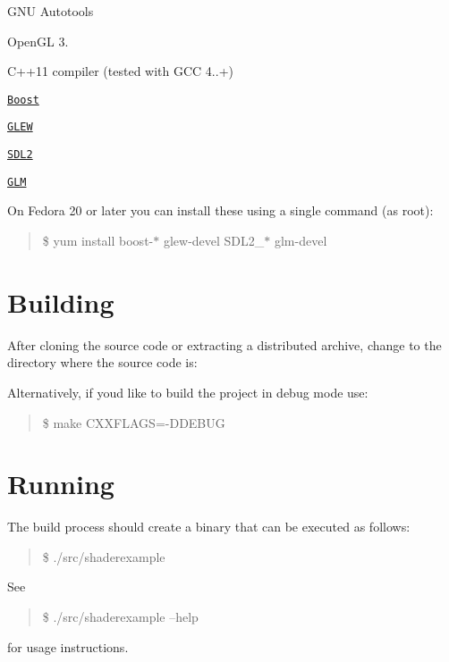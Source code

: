 
\begin{DoxyItemize}
\item G\+N\+U Autotools
\item Open\+G\+L 3.
\item C++11 compiler (tested with G\+C\+C 4..+)
\item \href{http://www.boost.org/}{\tt Boost}
\item \href{http://glew.sourceforge.net/}{\tt G\+L\+E\+W}
\item \href{https://www.libsdl.org/}{\tt S\+D\+L2}
\item \href{http://glm.g-truc.net/}{\tt G\+L\+M}
\end{DoxyItemize}

On Fedora 20 or later you can install these using a single command (as root)\+:

\begin{quote}
\$ yum install boost-\/$\ast$ glew-\/devel S\+D\+L2\+\_\+$\ast$ glm-\/devel \end{quote}


\section*{Building}

After cloning the source code or extracting a distributed archive, change to the directory where the source code is\+:




Alternatively, if you\textquotesingle{}d like to build the project in debug mode use\+:

\begin{quote}
\$ make C\+X\+X\+F\+L\+A\+G\+S=-\/\+D\+D\+E\+B\+U\+G \end{quote}


\section*{Running}

The build process should create a binary that can be executed as follows\+:

\begin{quote}
\$ ./src/shaderexample \end{quote}


See

\begin{quote}
\$ ./src/shaderexample --help \end{quote}


for usage instructions. 